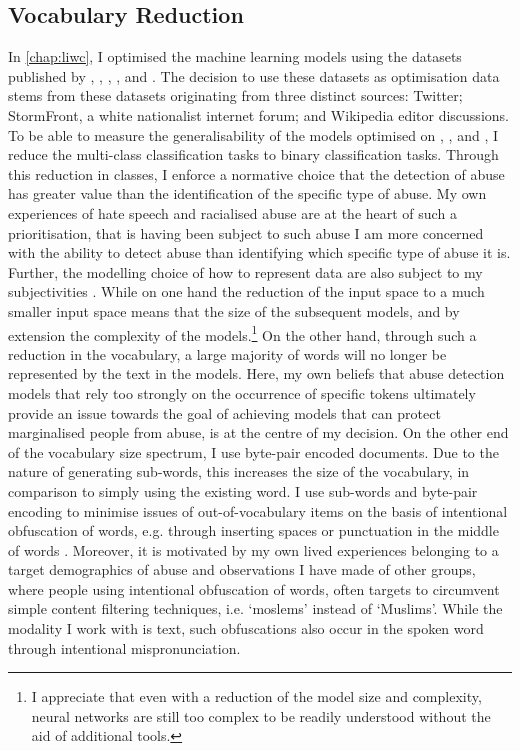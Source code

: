 \subsection{Vocabulary Reduction}\label{sub:vocab_redux}
In \autoref{chap:liwc}, I optimised the machine learning models using the datasets published by \citet{Davidson:2017}, \citet{Wulczyn:2016}, \citet{Waseem:2016}, \citet{Waseem-Hovy:2016}, and \citet{Garcia:2018}.
The decision to use these datasets as optimisation data stems from these datasets originating from three distinct sources: Twitter; StormFront, a white nationalist internet forum; and Wikipedia editor discussions.
To be able to measure the generalisability of the models optimised on \citet{Davidson:2017}, \citet{Waseem:2016}, and \citet{Waseem-Hovy:2016}, I reduce the multi-class classification tasks to binary classification tasks.
Through this reduction in classes, I enforce a normative choice that the detection of abuse has greater value than the identification of the specific type of abuse.
My own experiences of hate speech and racialised abuse are at the heart of such a prioritisation, that is having been subject to such abuse I am more concerned with the ability to detect abuse than identifying which specific type of abuse it is.
Further, the modelling choice of how to represent data are also subject to my subjectivities .
While on one hand the reduction of the input space to a much smaller input space means that the size of the subsequent models, and by extension the complexity of the models.\footnote{I appreciate that even with a reduction of the model size and complexity, neural networks are still too complex to be readily understood without the aid of additional tools.}
On the other hand, through such a reduction in the vocabulary, a large majority of words will no longer be represented by the text in the models.
Here, my own beliefs that abuse detection models that rely too strongly on the occurrence of specific tokens ultimately provide an issue towards the goal of achieving models that can protect marginalised people from abuse, is at the centre of my decision.
On the other end of the vocabulary size spectrum, I use byte-pair encoded documents.
Due to the nature of generating sub-words, this increases the size of the vocabulary, in comparison to simply using the existing word.
I use sub-words and byte-pair encoding to minimise issues of out-of-vocabulary items on the basis of intentional obfuscation of words, e.g. through inserting spaces or punctuation in the middle of words \citep{Rottger:2021}.
Moreover, it is motivated by my own lived experiences belonging to a target demographics of abuse and observations I have made of other groups, where people using intentional obfuscation of words, often targets to circumvent simple content filtering techniques, i.e. `moslems' instead of `Muslims'.
While the modality I work with is text, such obfuscations also occur in the spoken word through intentional mispronunciation.

